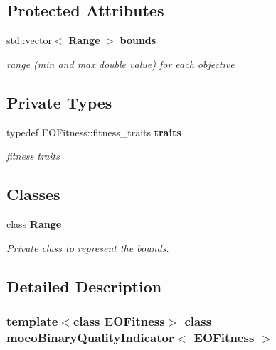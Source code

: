 \subsection*{Protected Attributes}
\begin{CompactItemize}
\item 
std::vector$<$ {\bf Range} $>$ {\bf bounds}\label{classmoeoBinaryQualityIndicator_a3bce334c4e74a22c0eb1026592d2f90}

\begin{CompactList}\small\item\em range (min and max double value) for each objective \item\end{CompactList}\end{CompactItemize}
\subsection*{Private Types}
\begin{CompactItemize}
\item 
typedef EOFitness::fitness\_\-traits {\bf traits}\label{classmoeoBinaryQualityIndicator_a23261c88b3ce39b9fed704cad328a76}

\begin{CompactList}\small\item\em fitness traits \item\end{CompactList}\end{CompactItemize}
\subsection*{Classes}
\begin{CompactItemize}
\item 
class {\bf Range}
\begin{CompactList}\small\item\em Private class to represent the bounds. \item\end{CompactList}\end{CompactItemize}


\subsection{Detailed Description}
\subsubsection*{template$<$class EOFitness$>$ class moeo\-Binary\-Quality\-Indicator$<$ EOFitness $>$}

